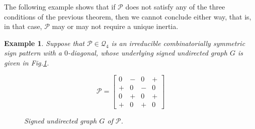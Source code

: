 \documentclass[a4paper, 10pt]{article}
\newtheorem{eg}{Example}[section]
\numberwithin{equation}{section}
\begin{document}

The following example shows that if $\mathcal{P}$ does not satisfy any of the three conditions of the previous theorem, then we cannot conclude either way, that is, in that case, $\mathcal{P}$ may or may not require a unique inertia.

\begin{eg}\label{eg0.6}
	Suppose that $\mathcal{P}\in \mathcal{Q}_4$ is an irreducible combinatorially symmetric sign pattern with a $0$-diagonal, whose underlying signed undirected graph $G$ is given in Fig.\ref{fign1}.
	\begin{figure}[H]
		\centering
		\begin{minipage}{.45\textwidth}
			\vspace{-1cm}
			\[
			\mathcal{P}=
			\begin{bmatrix}
				0 & - & 0 & + \\
				+ & 0 & - & 0 \\
				0 & + & 0 & + \\
				+ & 0 & + & 0
			\end{bmatrix}
			\]
		\end{minipage}
		\hspace{0.05\textwidth}
		\begin{minipage}{.45\textwidth}
			\centering
			\tikzset{node distance=1cm}
			\caption{Signed undirected graph $ G$ of $\mathcal{P}$.}
			\label{fign1}
		\end{minipage}
	\end{figure}
	

\end{eg}
\end{document}
